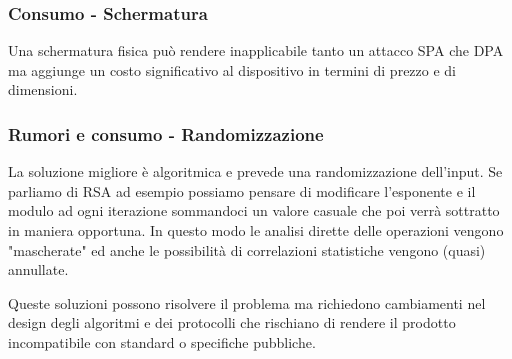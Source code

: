 		\subsubsection*{Consumo - Schermatura}
			Una schermatura fisica può rendere inapplicabile tanto un attacco \ac{SPA} che \ac{DPA} ma aggiunge un costo significativo al dispositivo in termini di prezzo e di dimensioni.			
		
		\subsubsection*{Rumori e consumo - Randomizzazione}		
			La soluzione migliore è algoritmica e prevede una randomizzazione dell'input. Se parliamo di RSA ad esempio possiamo pensare di modificare l'esponente e il modulo ad ogni iterazione sommandoci un valore casuale che poi verrà sottratto in maniera opportuna. In questo modo le analisi dirette delle operazioni vengono "mascherate" ed anche le possibilità di correlazioni statistiche vengono (quasi) annullate.
			
			Queste soluzioni possono risolvere il problema ma richiedono cambiamenti nel design degli algoritmi e dei protocolli che rischiano di rendere il prodotto incompatibile con standard o specifiche pubbliche.